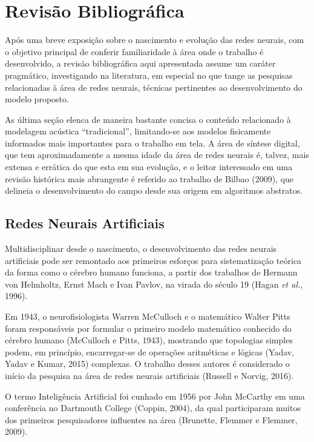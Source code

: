 \documentclass[]{article}
\begin{document}
\hypertarget{revisuxe3o-bibliogruxe1fica}{%
\section{Revisão Bibliográfica}\label{revisuxe3o-bibliogruxe1fica}}

Após uma breve exposição sobre o nascimento e evolução das redes
neurais, com o objetivo principal de conferir familiaridade à área onde
o trabalho é desenvolvido, a revisão bibliográfica aqui apresentada
assume um caráter pragmático, investigando na literatura, em especial no
que tange as pesquisas relacionadas à área de redes neurais, técnicas
pertinentes ao desenvolvimento do modelo proposto.

As última seção elenca de maneira bastante concisa o conteúdo
relacionado à modelagem acústica ``tradicional'', limitando-se aos
modelos fisicamente informados mais importantes para o trabalho em tela.
A área de síntese digital, que tem aproximadamente a mesma idade da área
de redes neurais é, talvez, mais extensa e errática do que esta em sua
evolução, e o leitor interessado em uma revisão histórica mais
abrangente é referido ao trabalho de Bilbao (2009), que delineia o
desenvolvimento do campo desde sua origem em algoritmos abstratos.

\hypertarget{redes-neurais-artificiais}{%
\subsection{Redes Neurais Artificiais}\label{redes-neurais-artificiais}}

Multidisciplinar desde o nascimento, o desenvolvimento das redes neurais
artificiais pode ser remontado aos primeiros esforços para
sistematização teórica da forma como o cérebro humano funciona, a partir
dos trabalhos de Hermann von Helmholtz, Ernst Mach e Ivan Pavlov, na
virada do século 19 (Hagan \emph{et al.}, 1996).

Em 1943, o neurofisiologista Warren McCulloch e o matemático Walter
Pitts foram responsáveis por formular o primeiro modelo matemático
conhecido do cérebro humano (McCulloch e Pitts, 1943), mostrando que
topologias simples podem, em princípio, encarregar-se de operações
aritméticas e lógicas (Yadav, Yadav e Kumar, 2015) complexas. O trabalho
desses autores é considerado o início da pesquisa na área de redes
neurais artificiais (Russell e Norvig, 2016).

O termo Inteligência Artificial foi cunhado em 1956 por John McCarthy em
uma conferência no Dartmouth College (Coppin, 2004), da qual
participaram muitos dos primeiros pesquisadores influentes na área
(Brunette, Flemmer e Flemmer, 2009).
\end{document}
